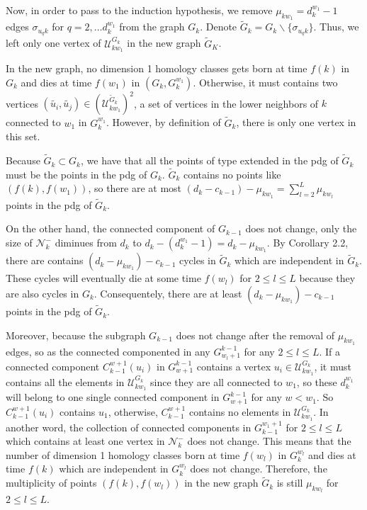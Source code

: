 \documentclass[a4paper,12pt]{article}
\numberwithin{equation}{section}
\begin{document}
	
	Now, in order to pass to the induction hypothesis, we remove $\mu_{kw_1} = d_k^{w_1} -1$ edges $\sigma_{u_q k}$ for $q = 2,\ldots d_k^{w_1}$ from the graph $G_k$. Denote $\tilde{G}_k = G_k \backslash \{ \sigma_{u_q k} \}$. Thus, we left only one vertex of $\mathcal{U}_{kw_1}^{G_k}$ in the new graph $\tilde{G}_K$. 
	
	In the new graph, no dimension 1 homology classes gets born at time $f(k)$ in $G_k$ and dies at time $f(w_1)$ in $(G_k,G^{w_1}_k)$. Otherwise, it must contains two vertices $(\tilde{u_i}, \tilde{u_j}) \in (\mathcal{U}_{kw_1}^{\tilde{G}_k})^2 $, a set of vertices in the lower neighbors of $k$ connected to $w_1$ in $G_k^{w_1}$. However, by definition of $\tilde{G}_k$, there is only one vertex in this set.
	
	Because $\tilde{G}_k \subset G_k$, we have that all the points of type extended in the pdg of $\tilde{G}_k$ must be the points in the pdg of $G_k$. $\tilde{G}_k$ contains no points like $(f(k),f(w_1))$, so there are at most $(d_k - c_{k-1}) - \mu_{kw_1} = \sum_{l=2}^L \mu_{kw_l}$ points in the pdg of $\tilde{G}_k$. 
	
	On the other hand, the connected component of $G_{k-1}$ does not change, only the size of $\mathcal{N}_k^-$ diminues from $d_k$ to $d_k - (d_k^{w_1} -1) = d_k - \mu_{kw_1}$. By Corollary 2.2, there are contains $(d_k - \mu_{kw_1}) - c_{k-1}$ cycles in $\tilde{G}_k$ which are independent in $\tilde{G}_k$. These cycles will eventually die at some time $f(w_l)$ for $2\leq l \leq L$ because they are also cycles in $G_k$. Consequentely, there are at least $(d_k - \mu_{kw_1}) - c_{k-1}$ points in the pdg of $\tilde{G}_k$.
	
	Moreover, because the subgraph $G_{k-1}$ does not change after the removal of $\mu_{kw_1}$ edges, so as the connected componented in any $G_{w_l+1}^{k-1}$ for any $2 \leq l \leq L$. If a connected component $C_{k-1}^{w+1}(u_i)$ in $G_{w+1}^{k-1}$ contains a vertex $u_i \in \mathcal{U}_{kw_1}^{G_k}$, it must contains all the elements in $\mathcal{U}_{kw_1}^{G_k}$ since they are all connected to $w_1$, so these $d_k^{w_1}$ will belong to one single connected component in $G_{w+1}^{k-1}$ for any $w < w_1$. So $C_{k-1}^{w+1}(u_i)$ contains $u_1$, otherwise, $C_{k-1}^{w+1}$ contains no elements in $\mathcal{U}_{kw_1}^{G_k}$. In another word, the collection of connected components in $G_{k-1}^{w_1+1}$ for $2 \leq l \leq L$ which contains at least one vertex in $\mathcal{N}_k^-$ does not change. This means that the number of dimension 1 homology classes born at time $f(w_l)$ in $G_k^{w_l}$ and dies at time $f(k)$ which are independent in $G_k^{w_l}$ does not change. Therefore, the multiplicity of points $(f(k),f(w_l))$ in the new graph $\tilde{G}_k$ is still $\mu_{kw_l}$ for $2 \leq l \leq L$. 
	
\end{document}
